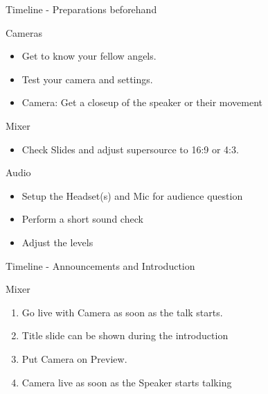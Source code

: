 \documentclass[aspectratio=169]{beamer}
\begin{document}
\begin{frame}{Timeline - Preparations beforehand}
	\begin{block}{Cameras}
		\begin{itemize}
			\item Get to know your fellow angels.
			\item Test your camera and settings.
			\item Camera: Get a closeup of the speaker or their movement
		\end{itemize}
	\end{block}
	\begin{block}{Mixer}
		\begin{itemize}
			\item Check Slides and adjust supersource to 16:9 or 4:3.
		\end{itemize}
	\end{block}
	\begin{block}{Audio}
	\begin{itemize}
		\item Setup the Headset(s) and Mic for audience question
		\item Perform a short sound check
		 \item Adjust the levels
	\end{itemize}
\end{block}
\end{frame}

\begin{frame}{Timeline - Announcements and Introduction}
	
	\begin{block}{Mixer}
		\begin{enumerate}
			\item Go live with Camera as soon as the talk starts.
			\item Title slide can be shown during the introduction 
			\item Put Camera  on Preview.
			\item Camera live as soon as the Speaker starts talking
		\end{enumerate}
	\end{block}
\end{frame}
\end{document}
